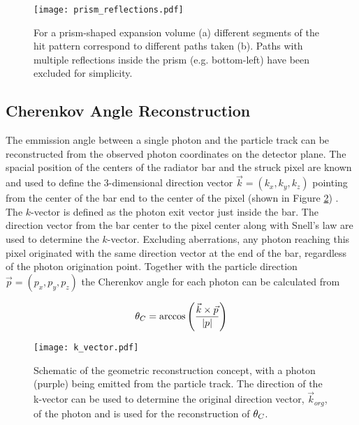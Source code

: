 \begin{figure}[H]
	\centering
	\texttt{[image: prism\_reflections.pdf]}
	\caption{For a prism-shaped expansion volume (a) different segments of the hit pattern correspond to different paths taken (b). Paths with multiple reflections inside the prism (e.g. bottom-left) have been excluded for simplicity.}
	\label{fig:prism_reflections}
\end{figure}

\subsection{Cherenkov Angle Reconstruction}
The emmission angle between a single photon and the particle track can be reconstructed from the observed photon coordinates on the detector plane. The spacial position of the centers of the radiator bar and the struck pixel are known and used to define the 3-dimensional direction vector $\vec{k} = (k_x, k_y, k_z)$ pointing from the center of the bar end to the center of the pixel (shown in Figure \ref{fig:k_vector}) . The $k$-vector is defined as the photon exit vector just inside the bar. The direction vector from the bar center to the pixel center along with Snell's law are used to determine the $k$-vector. Excluding aberrations, any photon reaching this pixel originated with the same direction vector at the end of the bar, regardless of the photon origination point. Together with the particle direction $\vec{p} = (p_x, p_y, p_z)$ the Cherenkov angle for each photon can be calculated from

\begin{equation}
	\theta_{C} = \arccos\left(\frac{\vec{k}\times\vec{p}}{|p|}\right)
\end{equation}

\begin{figure}[!htb]
	\centering
	\texttt{[image: k\_vector.pdf]}
	\caption{Schematic of the geometric reconstruction concept, with a photon (purple) being emitted from the particle track. The direction of the k-vector can be used to determine the original direction vector, $\vec{k}_{org}$, of the photon and is used for the reconstruction of $\theta_{C}$.}
	\label{fig:k_vector}
\end{figure}

